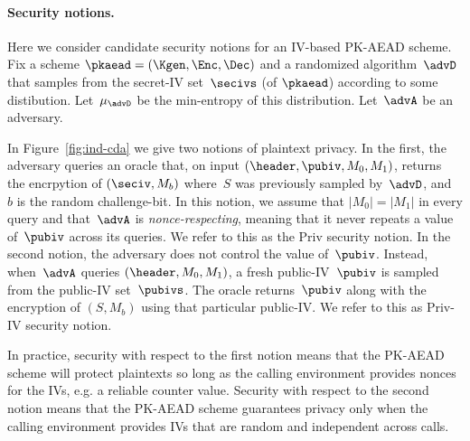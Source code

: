 
\paragraph{Security notions. } 
Here we consider candidate security notions for an IV-based PK-AEAD scheme.  Fix a scheme $\pkaead=(\Kgen,\Enc,\Dec)$ and a randomized algorithm~$\advD$ that samples from the secret-IV set~$\secivs$ (of $\pkaead$) according to some distibution.  Let~$\mu_\advD$ be the min-entropy of this distribution.  Let~$\advA$ be an adversary.  

In Figure~\ref{fig:ind-cda} we give two notions of plaintext privacy.  In the first, the adversary queries an oracle that, on input $(\header,\pubiv,M_0,M_1)$, returns the encrpytion of $(\seciv,M_b)$ where~$S$ was previously sampled by~$\advD$, and~$b$ is the random challenge-bit.  In this notion, we assume that $|M_0|=|M_1|$ in every query and that~$\advA$ is \emph{nonce-respecting}, meaning that it never repeats a value of~$\pubiv$ across its queries.  We refer to this as the Priv security notion.
In the second notion, the adversary does not control the value of~$\pubiv$.  Instead, when~$\advA$ queries $(\header,M_0,M_1)$, a fresh public-IV~$\pubiv$ is sampled from the public-IV set~$\pubivs$.  The oracle returns~$\pubiv$ along with the encryption of $(S,M_b)$ using that particular public-IV.  We refer to this as Priv-IV security notion.

In practice, security with respect to the first notion means that the PK-AEAD scheme will protect plaintexts so long as the calling environment provides nonces for the IVs, e.g. a reliable counter value.  Security with respect to the second notion means that the PK-AEAD scheme guarantees privacy only when the calling environment provides IVs that are random and independent across calls.

